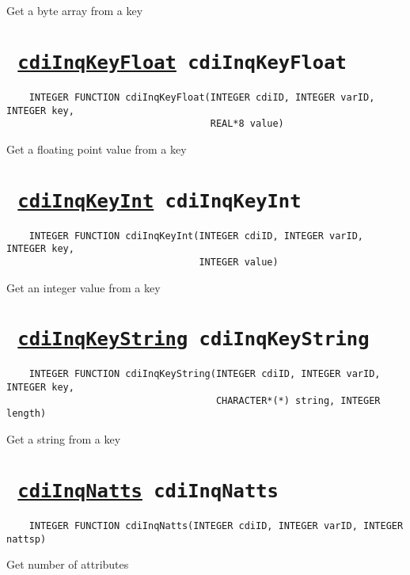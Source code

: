 Get a byte array from a key
\ifpdfoutput{}{(\ref{cdiInqKeyBytes})}


\section*{\texttt{ 
\ifpdf
\hyperref[cdiInqKeyFloat]{cdiInqKeyFloat}
\else
cdiInqKeyFloat
\fi
}}
\begin{verbatim}
    INTEGER FUNCTION cdiInqKeyFloat(INTEGER cdiID, INTEGER varID, INTEGER key, 
                                    REAL*8 value)
\end{verbatim}

Get a floating point value from a key
\ifpdfoutput{}{(\ref{cdiInqKeyFloat})}


\section*{\texttt{ 
\ifpdf
\hyperref[cdiInqKeyInt]{cdiInqKeyInt}
\else
cdiInqKeyInt
\fi
}}
\begin{verbatim}
    INTEGER FUNCTION cdiInqKeyInt(INTEGER cdiID, INTEGER varID, INTEGER key, 
                                  INTEGER value)
\end{verbatim}

Get an integer value from a key
\ifpdfoutput{}{(\ref{cdiInqKeyInt})}


\section*{\texttt{ 
\ifpdf
\hyperref[cdiInqKeyString]{cdiInqKeyString}
\else
cdiInqKeyString
\fi
}}
\begin{verbatim}
    INTEGER FUNCTION cdiInqKeyString(INTEGER cdiID, INTEGER varID, INTEGER key, 
                                     CHARACTER*(*) string, INTEGER length)
\end{verbatim}

Get a string from a key
\ifpdfoutput{}{(\ref{cdiInqKeyString})}


\section*{\texttt{ 
\ifpdf
\hyperref[cdiInqNatts]{cdiInqNatts}
\else
cdiInqNatts
\fi
}}
\begin{verbatim}
    INTEGER FUNCTION cdiInqNatts(INTEGER cdiID, INTEGER varID, INTEGER nattsp)
\end{verbatim}

Get number of attributes
\ifpdfoutput{}{(\ref{cdiInqNatts})}


